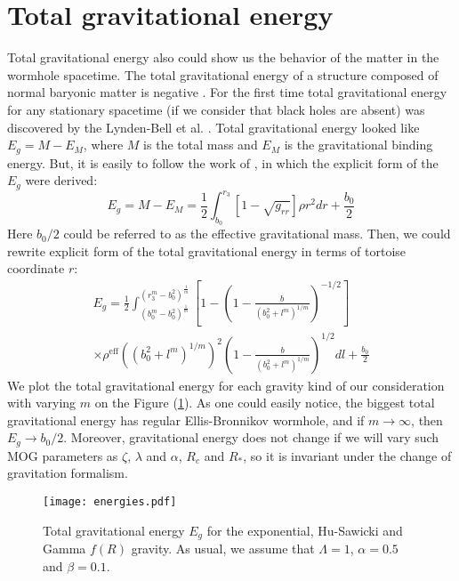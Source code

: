 \section{Total gravitational energy}\label{sec6}

Total gravitational energy also could show us the behavior of the matter in the wormhole spacetime.  The total gravitational energy of a structure composed of normal baryonic matter is negative \cite{ref81}. For the first time total gravitational energy for any stationary spacetime (if we consider that black holes are absent) was discovered by the Lynden-Bell et al. \cite{ref82}. Total gravitational energy looked like $E_g=M-E_M$, where $M$ is the total mass and $E_M$ is the gravitational binding energy. But, it is easily to follow the work of \cite{ref83}, in which the explicit form of the $E_g$ were derived:
\begin{equation}
    E_g = M-E_M= \frac{1}{2}\int^{r_3}_{b_0}[1-\sqrt{g_{rr}}]\rho r^2 dr + \frac{b_0}{2}
    \label{eq:35}
\end{equation}
Here $b_0/2$ could be referred to as the effective gravitational mass. Then, we could rewrite explicit form of the total gravitational energy in terms of tortoise coordinate $r$:
\begin{multline}
    E_g = \frac{1}{2}\int^{\left(r_3^m-b_0^2\right)^{\frac{1}{m}}}_{\left(b_0^m-b_0^2\right)^{\frac{1}{m}}}\left[1-\left(1-\frac{b}{(b_0^2+l^m)^{1/m}}\right)^{-1/2}\right]\\
    \times\rho^{\mathrm{eff}} ((b_0^2+l^m)^{1/m})^2 \left(1-\frac{b}{(b_0^2+l^m)^{1/m}}\right)^{1/2}dl + \frac{b_0}{2}
    \label{eq:35}
\end{multline}
We plot the total gravitational energy for each gravity kind of our consideration with varying $m$ on the Figure (\ref{fig:99}). As one could easily notice, the biggest total gravitational energy has regular Ellis-Bronnikov wormhole, and if $m\to\infty$, then $E_g\to b_0/2$. Moreover, gravitational energy does not change if we will vary such MOG parameters as $\zeta$, $\lambda$ and $\alpha$, $R_c$ and $R_*$, so it is invariant under the change of gravitation formalism.
\begin{widetext}

\begin{figure}[!htbp]
    \centering
    \texttt{[image: energies.pdf]}
    \caption{Total gravitational energy $E_{g}$ for the exponential, Hu-Sawicki and Gamma $f(R)$ gravity. As usual, we assume that $\Lambda=1$, $\alpha=0.5$ and $\beta=0.1$.}
    \label{fig:99}
\end{figure}

\end{widetext}

